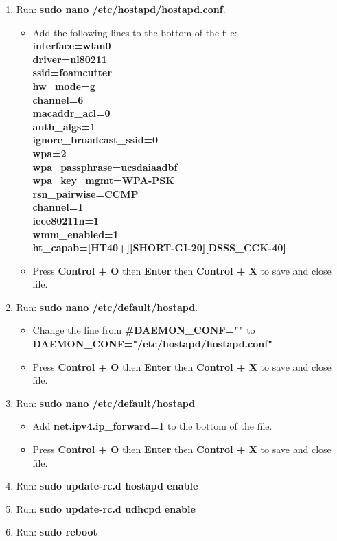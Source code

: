 \documentclass[titlepage,12pt,letter]{report}
\numberwithin{equation}{chapter}
\begin{document}
\begin{enumerate}[noitemsep,topsep=0pt]
	\item Run: \textbf{sudo nano /etc/hostapd/hostapd.conf}.
	\begin{itemize}[noitemsep,topsep=0pt]
		\item Add the following lines to the bottom of the file:\\
		\textbf{interface=wlan0} \\
		\textbf{driver=nl80211}\\
		\textbf{ssid=foamcutter}\\
		\textbf{hw\_mode=g}\\
		\textbf{channel=6}\\
		\textbf{macaddr\_acl=0}\\
		\textbf{auth\_algs=1}\\
		\textbf{ignore\_broadcast\_ssid=0}\\
		\textbf{wpa=2}\\
		\textbf{wpa\_passphrase=ucsdaiaadbf}\\
		\textbf{wpa\_key\_mgmt=WPA-PSK} \\   
		\textbf{rsn\_pairwise=CCMP}\\
		
		\textbf{channel=1}\\
		\textbf{ieee80211n=1}    \\     
		\textbf{wmm\_enabled=1}    \\ 
		\textbf{ht\_capab=[HT40+][SHORT-GI-20][DSSS\_CCK-40]}
		\item Press \textbf{Control + O} then \textbf{Enter} then \textbf{Control + X} to save and close file.
	\end{itemize}

	\item Run: \textbf{sudo nano /etc/default/hostapd}.
	\begin{itemize}[noitemsep,topsep=0pt]
		\item Change the line from \textbf{\#DAEMON\_CONF=""} to \\ \textbf{DAEMON\_CONF="/etc/hostapd/hostapd.conf"}
		\item Press \textbf{Control + O} then \textbf{Enter} then \textbf{Control + X} to save and close file.
	\end{itemize}

	\item Run: \textbf{sudo nano /etc/default/hostapd}
	\begin{itemize}[noitemsep,topsep=0pt]
		\item Add \textbf{net.ipv4.ip\_forward=1} to the bottom of the file.
		\item Press \textbf{Control + O} then \textbf{Enter} then \textbf{Control + X} to save and close file.
	\end{itemize}

	\item Run: \textbf{sudo update-rc.d hostapd enable}
	\item Run: \textbf{sudo update-rc.d udhcpd enable}
	\item Run: \textbf{sudo reboot}	
\end{enumerate}
\end{document}
